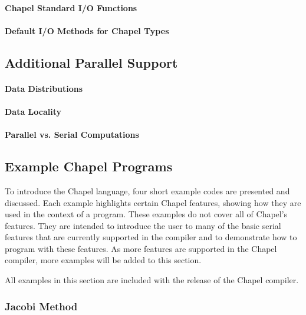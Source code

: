 \paragraph{Chapel Standard I/O Functions}
\paragraph{Default I/O Methods for Chapel Types}

\subsection{Additional Parallel Support}
\paragraph{Data Distributions}
\paragraph{Data Locality}
\paragraph{Parallel vs. Serial Computations}

\subsection{Example Chapel Programs}

To introduce the Chapel language, four short example codes are presented and
discussed.  Each example highlights certain Chapel features, showing how they are used
in the context of a program.  These examples do not cover all of Chapel's features.
They are intended to introduce the user to many of the basic serial features that are
currently supported in the compiler and to demonstrate how to program with 
these features.  As more features are supported in the Chapel compiler, more 
examples will be added to this section.

All examples in this section are included with the release of the Chapel compiler.

\subsubsection{Jacobi Method}

